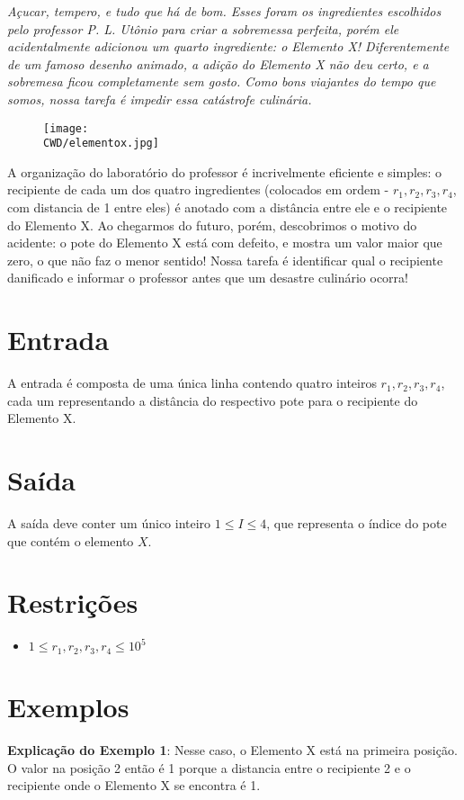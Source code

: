 \begin{center}
\textit{
	Açucar, tempero, e tudo que há de bom. Esses foram os ingredientes escolhidos pelo professor P. L. Utônio para criar a sobremessa perfeita,
	porém ele acidentalmente adicionou um quarto ingrediente: o Elemento X! Diferentemente de um famoso desenho animado, a adição do Elemento X não deu certo,
	e a sobremesa ficou completamente sem gosto. Como bons viajantes do tempo que somos, nossa tarefa é impedir essa catástrofe culinária.
  }
\end{center}



\begin{figure}[H]
    \centering
    \texttt{[image: \\CWD/elementox.jpg]}
\end{figure}

A organização do laboratório do professor é incrivelmente eficiente e simples: o recipiente de cada um dos quatro ingredientes (colocados em ordem - $r_1, r_2, r_3, r_4$, com distancia de 1 entre eles)
é anotado com a distância entre ele e o recipiente do Elemento X. Ao chegarmos do futuro, porém, descobrimos o motivo do acidente:
o pote do Elemento X está com defeito, e mostra um valor maior que zero, o que não faz o menor sentido!
Nossa tarefa é identificar qual o recipiente danificado e informar o professor antes que um desastre culinário ocorra!

\section*{Entrada}

A entrada é composta de uma única linha contendo quatro inteiros $r_1, r_2, r_3, r_4$, cada um representando a distância do respectivo pote para o recipiente do Elemento X.

\section*{Saída}

A saída deve conter um único inteiro $1 \leq I \leq 4$, que representa o índice do pote que contém o elemento $X$.

\section*{Restrições}

\begin{itemize}
\item $ 1 \leq r_1, r_2, r_3, r_4 \leq 10^5$
\end{itemize}

\section*{Exemplos}

\exemplo

\bigskip
\textbf{Explicação do Exemplo 1}: Nesse caso, o Elemento X está na primeira posição. O valor na posição 2 então é 1 porque a distancia entre o recipiente 2 e o recipiente onde o Elemento X se encontra é 1.
